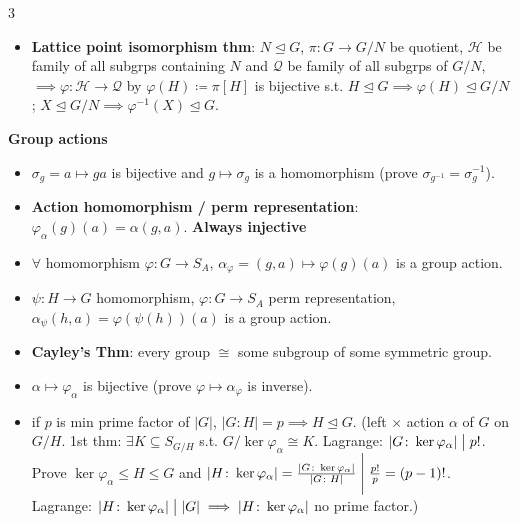 \documentclass[10pt]{article}
\newcommand{\abs}[1]{\left\lvert#1\right\rvert} %
\begin{document}
\begin{multicols*}{3}
\begin{itemize}
            \item \textbf{Lattice point isomorphism thm}: $N \trianglelefteq G$, $\pi \colon G \to G \slash N$ be quotient, $\mathcal{H}$ be family of all subgrps containing $N$ and $\mathcal{Q}$ be family of all subgrps of $G \slash N$, $\implies\varphi \colon \mathcal{H} \to \mathcal{Q}$ by $\varphi\left(H\right) \coloneqq \pi\left[H\right]$ is bijective s.t. $H \trianglelefteq G \implies \varphi\left(H\right) \trianglelefteq G \slash N$; $X \trianglelefteq G \slash N \implies \varphi^{-1}\left(X\right) \trianglelefteq G$.
        \end{itemize}
        \textbf{Group actions}
        \begin{itemize}
            \setlength\itemsep{2pt}
            \item $\sigma_g = a \mapsto ga$ is bijective and $g \mapsto \sigma_g$ is a homomorphism (prove $\sigma_{g^{-1}} = \sigma_g^{-1}$).
            \item \textbf{Action homomorphism / perm representation}: $\varphi_{\alpha}\left(g\right)\left(a\right) = \alpha\left(g, a\right)$. \textbf{Always injective}
            \item $\forall$ homomorphism $\varphi \colon G \to S_A$, $\alpha_{\varphi} = \left(g, a\right) \mapsto \varphi\left(g\right)\left(a\right)$ is a group action.
            \item $\psi \colon H \to G$ homomorphism, $\varphi \colon G \to S_A$ perm representation, $\alpha_{\psi}\left(h, a\right) = \varphi\left(\psi\left(h\right)\right)\left(a\right)$ is a group action.
            \item \textbf{Cayley's Thm}: every group $\cong$ some subgroup of some symmetric group.
            \item $\alpha \mapsto \varphi_{\alpha}$ is bijective (prove $\varphi \mapsto \alpha_{\varphi}$ is inverse).
            \item if $p$ is min prime factor of $\abs{G}$, $\abs{G \colon H} = p \implies H \trianglelefteq G$. (left $\times$ action $\alpha$ of $G$ on $G \slash H$. 1st thm: $\exists K \subseteq S_{G \slash H}$ s.t. $G \slash \ker{\varphi_{\alpha}} \cong K$. Lagrange: $\abs{G \colon \ker{\varphi_{\alpha}}} \bigm\vert p!$. Prove $\ker{\varphi_{\alpha}} \leq H \leq G$ and $\abs{H \colon \ker{\varphi_{\alpha}}} = \frac{\abs{G \colon \ker{\varphi_{\alpha}}}}{\abs{G \colon H}} \Biggm\vert \frac{p!}{p} = \left(p - 1\right)!$. Lagrange: $\abs{H \colon \ker{\varphi_{\alpha}}} \bigm\vert \abs{G} \implies \abs{H \colon \ker{\varphi_{\alpha}}}$ no prime factor.)

\end{itemize}
\end{multicols*}
\end{document}
